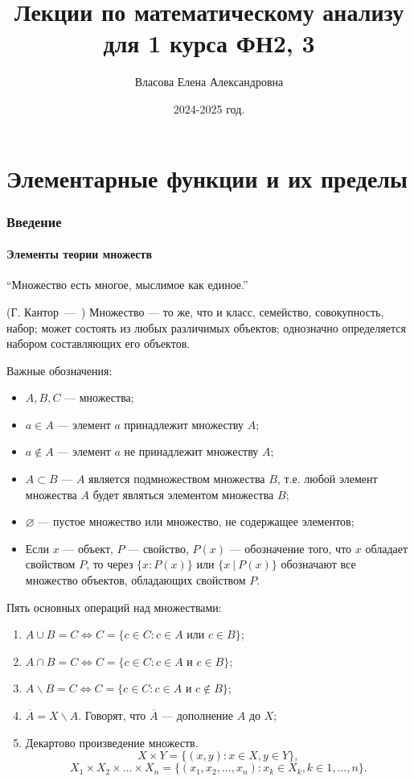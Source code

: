 \documentclass[a4paper,12pt]{article} %
\author{Власова Елена Александровна}
\title{Лекции по математическому анализу для 1 курса ФН2, 3}
\date{2024-2025 год.}
\let\oldquote\quote
\let\endoldquote\endquote
\renewenvironment{quote}[2][]
  {\if\relax\detokenize{#1}\relax
     \def\quoteauthor{#2}%
   \else
     \def\quoteauthor{#2~---~#1}%
   \fi
   \oldquote}
  {\par\nobreak\smallskip\hfill(\quoteauthor)%
   \endoldquote\addvspace{\bigskipamount}}
\theoremstyle{remark}
\theoremstyle{definition}
\begin{document}

\maketitle

\newpage
\tableofcontents
\newpage

\part*{Элементарные функции и их пределы}

\section{Введение}
\subsection{Элементы теории множеств}
\begin{quote}{Г. Кантор}
	``Множество есть многое, мыслимое как единое.''
\end{quote}
Множество --- то же, что и класс, семейство, совокупность, набор; может состоять из любых различимых объектов; однозначно определяется набором составляющих его объектов.

Важные обозначения:
\begin{itemize}
	\item $A, B, C$ --- множества;
	\item $a\in A$ --- элемент $a$ принадлежит множеству $A$;
	\item $a \not\in A$ --- элемент $a$ не принадлежит множеству $A$;
	\item $A\subset B$ --- $A$ является подмножеством множества $B$, т.е. любой элемент множества $A$ будет являться элементом множества $B$;
	\item $\varnothing$ --- пустое множество или множество, не содержащее элементов;
	\item Если $x$ --- объект, $P$ --- свойство, $P(x)$ --- обозначение того, что $x$ обладает свойством $P$, то через $\{x : P(x)\}$ или $\{x \ | \ P(x)\} $ обозначают все множество объектов, обладающих свойством $P$.
\end{itemize}

Пять основных операций над множествами:
\begin{enumerate}
	\item $A \cup B = C \iff C = \{c \in C : c \in A \text{ или } c\in B\}$;
	\item $A \cap B = C \iff C = \{c \in C : c\in A \text{ и } c\in B\}$;
	\item $A\backslash B = C \iff C = \{c\in C : c\in A \text{ и } c \not\in B\}$;
	\item $\overline{A} = X\backslash A$. Говорят, что $\overline{A}$ --- дополнение $A$ до $X$;
	\item Декартово произведение множеств.
		\[
		X \times Y = \{(x, y) : x \in X, y \in Y\} 
		,\] 
		\[
			X_1 \times X_2 \times \ldots \times X_n = \{(x_1, x_2, \ldots, x_{n}) : x_k \in X_k, k \in 1, \ldots, n \}
		.\] 
\end{enumerate}
\end{document}

